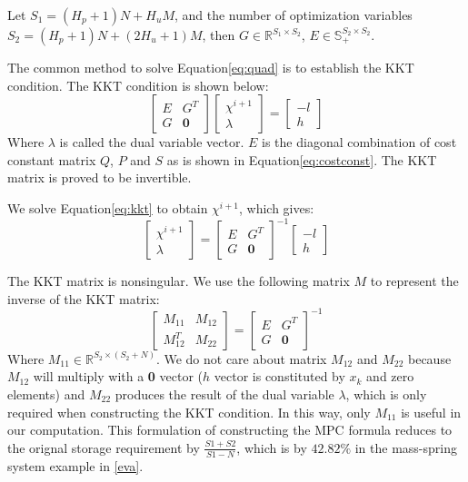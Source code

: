 Let $S_1=(H_p+1)N+H_uM$, and the number of optimization variables $S_2=(H_p+1)N+(2H_u+1)M$, then $G \in \mathbb{R}^{S_1\times S_2}$, $E \in \mathbb{S}_{+}^{S_2\times S_2}$.

The common method to solve Equation\cref{eq:quad} is to establish the KKT condition. The KKT condition is shown below:
\begin{equation}
\begin{bmatrix}
E&G^T\\
G&\textbf{0} 
\end{bmatrix}
\begin{bmatrix}
\chi^{i+1} \\
\lambda 
\end{bmatrix}=
\begin{bmatrix}
-l\\
h
\end{bmatrix}
\label{eq:kkt}
\end{equation}
Where $\lambda$ is called the dual variable vector. $E$ is the diagonal combination of cost constant matrix $Q$, $P$ and $S$ as is shown in Equation\cref{eq:costconst}. The KKT matrix is proved to be invertible\cite{6422363}.

We solve Equation\cref{eq:kkt} to obtain $\chi^{i+1}$, which gives:
\begin{equation}
\begin{bmatrix}
\chi^{i+1} \\
\lambda 
\end{bmatrix}=
\begin{bmatrix}
E&G^T\\
G&\textbf{0} 
\end{bmatrix}^{-1}
\begin{bmatrix}
-l\\
h
\end{bmatrix}
\label{eq:sol}
\end{equation}

The KKT matrix is nonsingular. We use the following matrix $M$ to represent the inverse of the KKT matrix:
\begin{equation*}
\begin{bmatrix}
M_{11}&M_{12}\\
M_{12}^T&M_{22} 
\end{bmatrix}
=
\begin{bmatrix}
E&G^T\\
G&\textbf{0} 
\end{bmatrix}^{-1}
\end{equation*}
Where $M_{11} \in \mathbb{R}^{S_2 \times (S_2+N)}$. We do not care about matrix $M_{12}$ and $M_{22}$ because $M_{12}$ will multiply with a \textbf{0} vector ($h$ vector is constituted by $x_{k}$ and zero elements) and $M_{22}$ produces the result of the dual variable $\lambda$, which is only required when constructing the KKT condition. In this way, only $M_{11}$ is useful in our computation. This formulation of constructing the MPC formula reduces to the orignal storage requirement by $\frac{S1+S2}{S1-N}$, which is by $42.82\%$ in the mass-spring system example in \cref{eva}.

